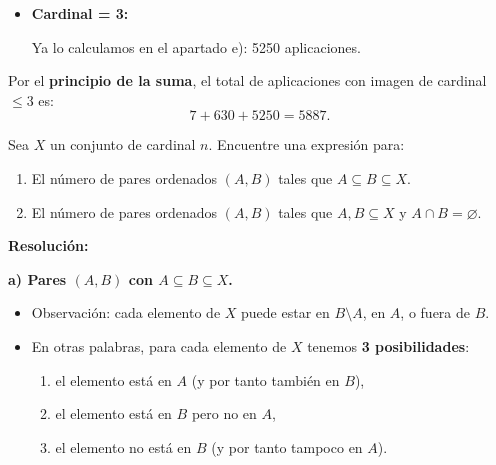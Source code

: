 \documentclass[a4paper,12pt]{article}
\begin{document}
    \begin{ejercicio}[title=Ejercicio 20]
    \begin{itemize}

    \item \textbf{Cardinal = 3:}

    Ya lo calculamos en el apartado e): 5250 aplicaciones.

\end{itemize}

Por el \textbf{principio de la suma}, el total de aplicaciones con imagen de cardinal $\le 3$ es:
\[
7 + 630 + 5250 = \boxed{5887}.
\]

\end{ejercicio}

\begin{ejercicio}[title=Ejercicio 24 (⋆)]
Sea $X$ un conjunto de cardinal $n$. Encuentre una expresión para:

\begin{enumerate}
\item[a)] El número de pares ordenados $(A,B)$ tales que $A \subseteq B \subseteq X$.
\item[b)] El número de pares ordenados $(A,B)$ tales que $A,B \subseteq X$ y $A \cap B = \varnothing$.
\end{enumerate}

\tcblower
\textbf{Resolución:}

\textbf{a) Pares $(A,B)$ con $A \subseteq B \subseteq X$.}

\begin{itemize}
\item Observación: cada elemento de $X$ puede estar en $B \setminus A$, en $A$, o fuera de $B$.
\item En otras palabras, para cada elemento de $X$ tenemos \textbf{3 posibilidades}:
\begin{enumerate}
\item el elemento está en $A$ (y por tanto también en $B$),
\item el elemento está en $B$ pero no en $A$,
\item el elemento no está en $B$ (y por tanto tampoco en $A$).
\end{enumerate}
\begin{center}
\end{center}
\end{itemize}
\end{ejercicio}
\end{document}
